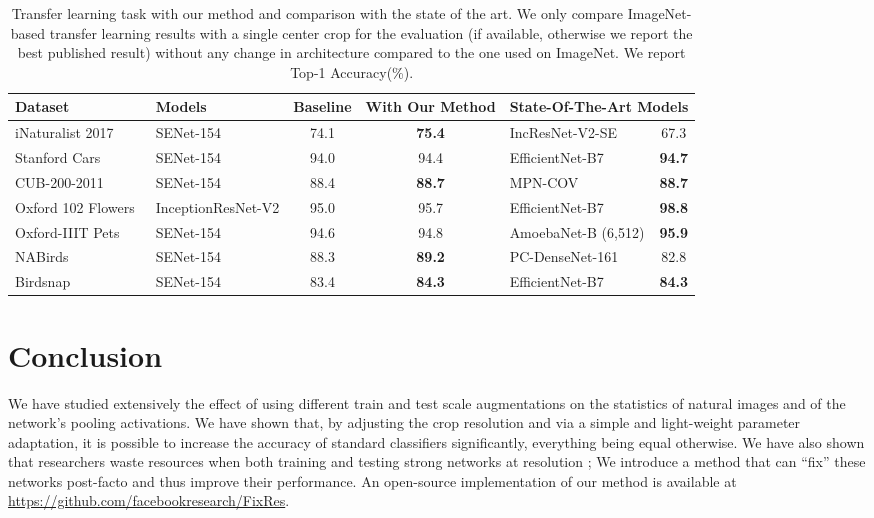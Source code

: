 \documentclass{article}
\begin{document}
\begin{table*}
\caption{\label{tab:transfertask}
 Transfer learning task with our method and comparison with the state of the art.
We only compare ImageNet-based transfer learning results with a single center crop for the evaluation (if available, otherwise we report the best published result) without any change in architecture compared to the one used on ImageNet.
We report Top-1 Accuracy(\%).
}
\centering
\small
\begin{tabular}{llcc|lc}
  \toprule
    Dataset & Models  & Baseline   & With Our Method &  \multicolumn{2}{c}{State-Of-The-Art Models} \\
\midrule
	iNaturalist 2017~\cite{Horn2017INaturalist} & SENet-154         & 74.1 & \textbf{75.4}  & IncResNet-V2-SE \cite{Horn2017INaturalist} & 67.3 \\
	Stanford Cars~\cite{Cars2013}               & SENet-154         & 94.0 & 94.4 & EfficientNet-B7  \cite{tan2019efficientnet}  & \textbf{94.7} \\
	CUB-200-2011~\cite{WahCUB_200_2011}         & SENet-154         & 88.4 & \textbf{88.7} & 	MPN-COV \cite{Li2017MPN} & \textbf{88.7}\\
	Oxford 102 Flowers~\cite{Nilsback08}        & InceptionResNet-V2& 95.0 & 95.7 &  EfficientNet-B7  \cite{tan2019efficientnet}  & \textbf{98.8}\\
	Oxford-IIIT Pets~\cite{parkhi12a}           & SENet-154         & 94.6 & 94.8 & AmoebaNet-B (6,512) \cite{Yanping2018GPipe}  &\textbf{95.9}\\
	NABirds~\cite{Horn2015NaBirds}              & SENet-154         & 88.3 & \textbf{89.2} & PC-DenseNet-161 \cite{Dubey2017PCDenseNet} & 82.8 \\
	Birdsnap~\cite{Berg2014Birdsnap}            & SENet-154         & 83.4 & \textbf{84.3}&  EfficientNet-B7  \cite{tan2019efficientnet}  & \textbf{84.3}\\
  \bottomrule
\end{tabular}
\end{table*} 
\section{Conclusion}

We have studied extensively the effect of using different train and test scale augmentations on the statistics of natural images and of the network's pooling activations.
We have shown that, by adjusting the crop resolution and via a simple and light-weight parameter adaptation, it is possible to increase the  accuracy of standard classifiers significantly, everything being equal otherwise.
We have also shown that researchers waste resources when both training and testing strong networks at resolution ;
We introduce a method that can ``fix'' these networks  post-facto and thus improve their performance.
An open-source implementation of our method is available at \url{https://github.com/facebookresearch/FixRes}.
\end{document}
